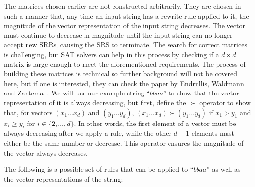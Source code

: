 The matrices chosen earlier are not constructed arbitrarily. They are chosen in such a manner that, any time an input string has a rewrite rule applied to it, the magnitude of the vector representation of the input string decreases. The vector must continue to decrease in magnitude until the input string can no longer accept new SRRs, causing the SRS to terminate. The search for correct matrices is challenging, but SAT solvers can help in this process by checking if a $d \times d$ matrix is large enough to meet the aforementioned requirements. The process of building these matrices is technical so further background will not be covered here, but if one is interested, they can check the paper by Endrullis, Waldmann and Zantema~\cite{Endrullis2006}.
We will use our example string ``$bbaa$'' to show that the vector representation of it is always decreasing, but first, define the $\succ$ operator to show that, for vectors $(x_1 \ldots x_d)$ and $(y_1 \ldots y_d)$, $(x_1 \ldots x_d) \succ (y_1 \ldots y_d)$ if $x_1 > y_1$ and $x_i \geq y_i$ for $i \in \{2, \ldots, d\}$. In other words, the first element of a vector must be always decreasing after we apply a rule, while the other $d-1$ elements must either be the same number or decrease. This operator ensures the magnitude of the vector always decreases. \par
The following is a possible set of rules that can be applied to ``$bbaa$'' as well as the vector representations of the string: \par
